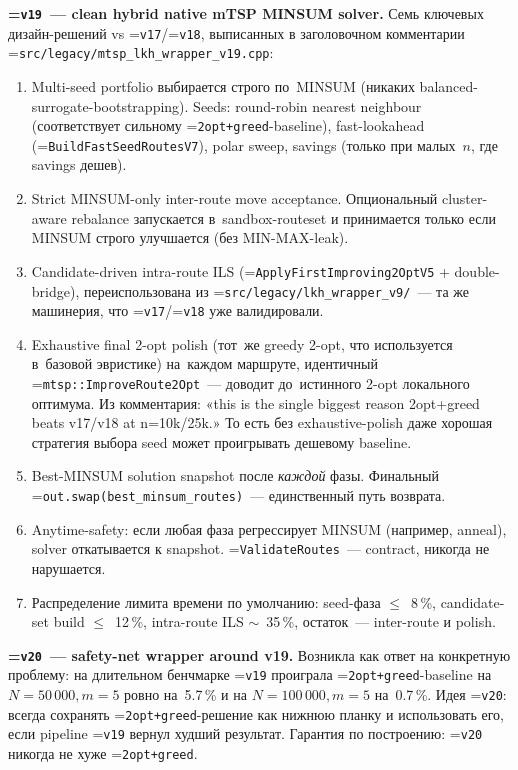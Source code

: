 \documentclass[a4paper,14pt]{extreport}
\makeatletter
\let\old@texttt\texttt
\renewcommand{\texttt}[1]{{\sloppy\hyphenchar\font=\m@ne\old@texttt{#1}}}
\makeatother
\begin{document}
\textbf{\texttt{v19}~--- clean hybrid native mTSP MINSUM solver.} Семь ключевых дизайн-решений vs \texttt{v17}/\texttt{v18}, выписанных в заголовочном комментарии \texttt{src/legacy/mtsp\_lkh\_wrapper\_v19.cpp}:
\begin{enumerate}
\item Multi-seed portfolio выбирается строго по~MINSUM (никаких balanced-surrogate-bootstrapping). Seeds: round-robin nearest neighbour (соответствует сильному \texttt{2opt+greed}-baseline), fast-lookahead (\texttt{BuildFastSeedRoutesV7}), polar sweep, savings (только при малых~$n$, где savings дешев).
\item Strict MINSUM-only inter-route move acceptance. Опциональный cluster-aware rebalance запускается в~sandbox-routeset и принимается только если MINSUM строго улучшается (без MIN-MAX-leak).
\item Candidate-driven intra-route ILS (\texttt{ApplyFirstImproving2OptV5} + double-bridge), переиспользована из \texttt{src/legacy/lkh\_wrapper\_v9/}~--- та же машинерия, что \texttt{v17}/\texttt{v18} уже валидировали.
\item Exhaustive final 2-opt polish (тот~же greedy 2-opt, что используется в~базовой эвристике) на~каждом маршруте, идентичный \texttt{mtsp::ImproveRoute2Opt}~--- доводит до~истинного 2-opt локального оптимума. Из комментария: «this is the single biggest reason 2opt+greed beats v17/v18 at n=10k/25k.» То есть без exhaustive-polish даже хорошая стратегия выбора seed может проигрывать дешевому baseline.
\item Best-MINSUM solution snapshot после \emph{каждой} фазы. Финальный \texttt{out.swap(best\_minsum\_routes)}~--- единственный путь возврата.
\item Anytime-safety: если любая фаза регрессирует MINSUM (например, anneal), solver откатывается к snapshot. \texttt{ValidateRoutes}~--- contract, никогда не нарушается.
\item Распределение лимита времени по умолчанию: seed-фаза $\leq$~8\,\%, candidate-set build $\leq$~12\,\%, intra-route ILS $\sim$~35\,\%, остаток~--- inter-route и polish.
\end{enumerate}

\textbf{\texttt{v20}~--- safety-net wrapper around v19.} Возникла как ответ на конкретную проблему: на длительном бенчмарке \texttt{v19} проиграла \texttt{2opt+greed}-baseline на $N=50\,000, m=5$ ровно на~5.7\,\% и на $N=100\,000, m=5$ на~0.7\,\%. Идея \texttt{v20}: всегда сохранять \texttt{2opt+greed}-решение как нижнюю планку и использовать его, если pipeline \texttt{v19} вернул худший результат. Гарантия по построению: \texttt{v20} никогда не хуже \texttt{2opt+greed}.
\end{document}
